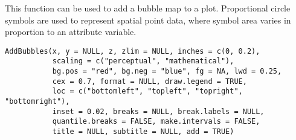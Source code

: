 \documentclass[a4paper]{book}
\begin{document}
%
\begin{Description}\relax
This function can be used to add a bubble map to a plot.
Proportional circle symbols are used to represent spatial point data, where symbol area varies in proportion to an attribute variable.
\end{Description}
%
\begin{Usage}
\begin{verbatim}
AddBubbles(x, y = NULL, z, zlim = NULL, inches = c(0, 0.2),
           scaling = c("perceptual", "mathematical"),
           bg.pos = "red", bg.neg = "blue", fg = NA, lwd = 0.25,
           cex = 0.7, format = NULL, draw.legend = TRUE,
           loc = c("bottomleft", "topleft", "topright", "bottomright"),
           inset = 0.02, breaks = NULL, break.labels = NULL,
           quantile.breaks = FALSE, make.intervals = FALSE,
           title = NULL, subtitle = NULL, add = TRUE)
\end{verbatim}
\end{Usage}
%
\end{document}
